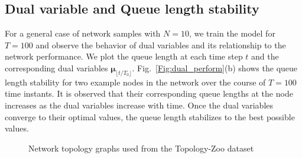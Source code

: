 \documentclass[lettersize,journal]{IEEEtran}
\begin{document}
\subsection{Dual variable and Queue length stability}
\begin{figure*}[htp]%
\centering   
    \hfill
\caption{Behavior of a dual variable and queue length stability for an example node in a network with 50 nodes and 5 flows.}
\label{Fig:dual_perform}
\end{figure*}
For a general case of network samples with $N=10$, we train the model for $T=100$ and observe the behavior of dual variables and its relationship to the network performance. We plot the queue length at each time step $t$ and the corresponding dual variables $\bm{\mu}_{\lfloor t/T_0 \rfloor}$.  Fig.~\ref{Fig:dual_perform}(b) shows the queue length stability for two example nodes in the network over the course of $T=100$ time instants. It is observed that their corresponding queue lengths at the node increases as the dual variables increase with time. Once the dual variables converge to their optimal values, the queue length stabilizes to the best possible values.  

\begin{figure}[htp]
    \centering   
    \hfill
    \hfill
    \hfill
    \caption{Network topology graphs used from the Topology-Zoo dataset}
    \label{Fig:real_topology}
\end{figure}
\end{document}

